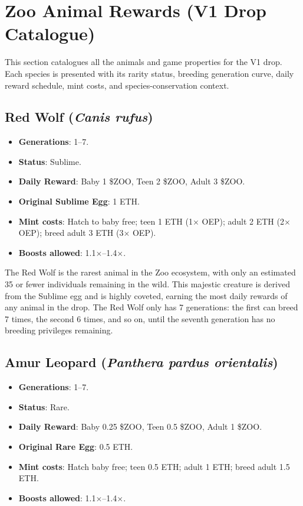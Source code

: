 \section{Zoo Animal Rewards (V1 Drop Catalogue)}
\label{sec:animals}

This section catalogues all the animals and game properties for the V1 drop. Each species is presented with its rarity status, breeding generation curve, daily reward schedule, mint costs, and species-conservation context.

\subsection{Red Wolf (\textit{Canis rufus})}

\begin{itemize}
  \item \textbf{Generations}: 1--7.
  \item \textbf{Status}: Sublime.
  \item \textbf{Daily Reward}: Baby 1 \$ZOO, Teen 2 \$ZOO, Adult 3 \$ZOO.
  \item \textbf{Original Sublime Egg}: 1 ETH.
  \item \textbf{Mint costs}: Hatch to baby free; teen 1 ETH (1$\times$ OEP); adult 2 ETH (2$\times$ OEP); breed adult 3 ETH (3$\times$ OEP).
  \item \textbf{Boosts allowed}: 1.1$\times$--1.4$\times$.
\end{itemize}

The Red Wolf is the rarest animal in the Zoo ecosystem, with only an estimated 35 or fewer individuals remaining in the wild. This majestic creature is derived from the Sublime egg and is highly coveted, earning the most daily rewards of any animal in the drop. The Red Wolf only has 7 generations: the first can breed 7 times, the second 6 times, and so on, until the seventh generation has no breeding privileges remaining.

\subsection{Amur Leopard (\textit{Panthera pardus orientalis})}

\begin{itemize}
  \item \textbf{Generations}: 1--7.
  \item \textbf{Status}: Rare.
  \item \textbf{Daily Reward}: Baby 0.25 \$ZOO, Teen 0.5 \$ZOO, Adult 1 \$ZOO.
  \item \textbf{Original Rare Egg}: 0.5 ETH.
  \item \textbf{Mint costs}: Hatch baby free; teen 0.5 ETH; adult 1 ETH; breed adult 1.5 ETH.
  \item \textbf{Boosts allowed}: 1.1$\times$--1.4$\times$.
\end{itemize}

